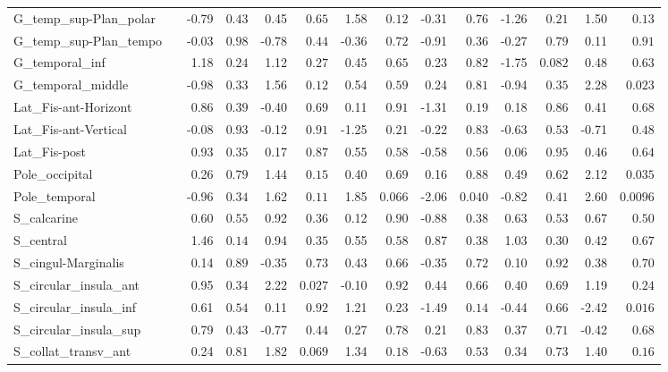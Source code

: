 {\begin{longtable}{llrrrrrrrrrrrr}
G\_temp\_sup-Plan\_polar &  & -0.79 & $0.43$ & 0.45 & $0.65$ & 1.58 & $0.12$ & -0.31 & $0.76$ & -1.26 & $0.21$ & 1.50 & $0.13$ \\
G\_temp\_sup-Plan\_tempo &  & -0.03 & $0.98$ & -0.78 & $0.44$ & -0.36 & $0.72$ & -0.91 & $0.36$ & -0.27 & $0.79$ & 0.11 & $0.91$ \\
G\_temporal\_inf &  & 1.18 & $0.24$ & 1.12 & $0.27$ & 0.45 & $0.65$ & 0.23 & $0.82$ & -1.75 & $0.082$ & 0.48 & $0.63$ \\
G\_temporal\_middle &  & -0.98 & $0.33$ & 1.56 & $0.12$ & 0.54 & $0.59$ & 0.24 & $0.81$ & -0.94 & $0.35$ & 2.28 & $0.023$ \\
Lat\_Fis-ant-Horizont &  & 0.86 & $0.39$ & -0.40 & $0.69$ & 0.11 & $0.91$ & -1.31 & $0.19$ & 0.18 & $0.86$ & 0.41 & $0.68$ \\
Lat\_Fis-ant-Vertical &  & -0.08 & $0.93$ & -0.12 & $0.91$ & -1.25 & $0.21$ & -0.22 & $0.83$ & -0.63 & $0.53$ & -0.71 & $0.48$ \\
Lat\_Fis-post &  & 0.93 & $0.35$ & 0.17 & $0.87$ & 0.55 & $0.58$ & -0.58 & $0.56$ & 0.06 & $0.95$ & 0.46 & $0.64$ \\
Pole\_occipital &  & 0.26 & $0.79$ & 1.44 & $0.15$ & 0.40 & $0.69$ & 0.16 & $0.88$ & 0.49 & $0.62$ & 2.12 & $0.035$ \\
Pole\_temporal &  & -0.96 & $0.34$ & 1.62 & $0.11$ & 1.85 & $0.066$ & -2.06 & $0.040$ & -0.82 & $0.41$ & 2.60 & $0.0096$ \\
S\_calcarine &  & 0.60 & $0.55$ & 0.92 & $0.36$ & 0.12 & $0.90$ & -0.88 & $0.38$ & 0.63 & $0.53$ & 0.67 & $0.50$ \\
S\_central &  & 1.46 & $0.14$ & 0.94 & $0.35$ & 0.55 & $0.58$ & 0.87 & $0.38$ & 1.03 & $0.30$ & 0.42 & $0.67$ \\
S\_cingul-Marginalis &  & 0.14 & $0.89$ & -0.35 & $0.73$ & 0.43 & $0.66$ & -0.35 & $0.72$ & 0.10 & $0.92$ & 0.38 & $0.70$ \\
S\_circular\_insula\_ant &  & 0.95 & $0.34$ & 2.22 & $0.027$ & -0.10 & $0.92$ & 0.44 & $0.66$ & 0.40 & $0.69$ & 1.19 & $0.24$ \\
S\_circular\_insula\_inf &  & 0.61 & $0.54$ & 0.11 & $0.92$ & 1.21 & $0.23$ & -1.49 & $0.14$ & -0.44 & $0.66$ & -2.42 & $0.016$ \\
S\_circular\_insula\_sup &  & 0.79 & $0.43$ & -0.77 & $0.44$ & 0.27 & $0.78$ & 0.21 & $0.83$ & 0.37 & $0.71$ & -0.42 & $0.68$ \\
S\_collat\_transv\_ant &  & 0.24 & $0.81$ & 1.82 & $0.069$ & 1.34 & $0.18$ & -0.63 & $0.53$ & 0.34 & $0.73$ & 1.40 & $0.16$ \\

\end{longtable}}
